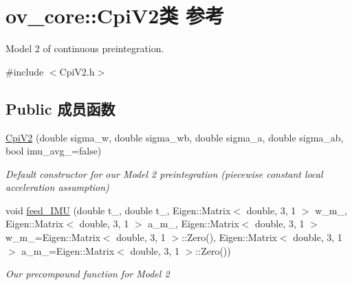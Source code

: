 \hypertarget{classov__core_1_1CpiV2}{}\section{ov\+\_\+core\+:\+:Cpi\+V2类 参考}
\label{classov__core_1_1CpiV2}


Model 2 of continuous preintegration.  




{\ttfamily \#include $<$Cpi\+V2.\+h$>$}

\subsection*{Public 成员函数}
\begin{DoxyCompactItemize}
\item 
\hyperlink{classov__core_1_1CpiV2_acc303eae31571a4a132cb8a161b6658b}{Cpi\+V2} (double sigma\+\_\+w, double sigma\+\_\+wb, double sigma\+\_\+a, double sigma\+\_\+ab, bool imu\+\_\+avg\+\_\+=false)
\begin{DoxyCompactList}\small\item\em Default constructor for our Model 2 preintegration (piecewise constant local acceleration assumption) \end{DoxyCompactList}\item 
void \hyperlink{classov__core_1_1CpiV2_a2e526d34b80061293a922fefa3a858a1}{feed\+\_\+\+I\+MU} (double t\+\_, double t\+\_, Eigen\+::\+Matrix$<$ double, 3, 1 $>$ w\+\_\+m\+\_, Eigen\+::\+Matrix$<$ double, 3, 1 $>$ a\+\_\+m\+\_, Eigen\+::\+Matrix$<$ double, 3, 1 $>$ w\+\_\+m\+\_=Eigen\+::\+Matrix$<$ double, 3, 1 $>$\+::Zero(), Eigen\+::\+Matrix$<$ double, 3, 1 $>$ a\+\_\+m\+\_=Eigen\+::\+Matrix$<$ double, 3, 1 $>$\+::Zero())
\begin{DoxyCompactList}\small\item\em Our precompound function for Model 2 \end{DoxyCompactList}\end{DoxyCompactItemize}
